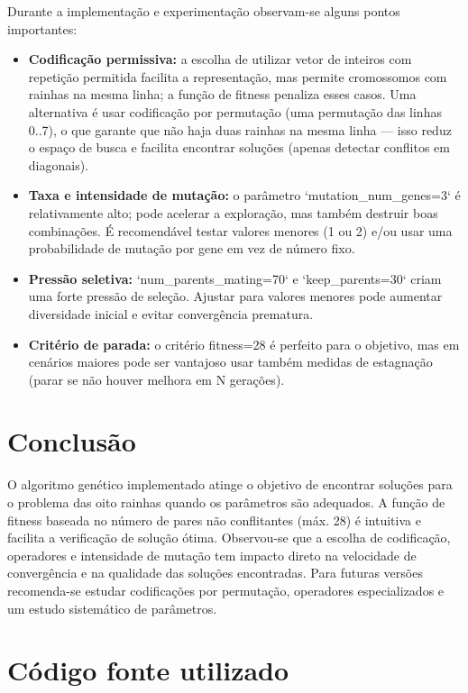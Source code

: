 \documentclass[a4paper,12pt]{article}
\begin{document}
Durante a implementação e experimentação observam-se alguns pontos importantes:

\begin{itemize}
  \item \textbf{Codificação permissiva:} a escolha de utilizar vetor de inteiros com repetição permitida facilita a representação, mas permite cromossomos com rainhas na mesma linha; a função de fitness penaliza esses casos. Uma alternativa é usar codificação por permutação (uma permutação das linhas 0..7), o que garante que não haja duas rainhas na mesma linha — isso reduz o espaço de busca e facilita encontrar soluções (apenas detectar conflitos em diagonais).
  \item \textbf{Taxa e intensidade de mutação:} o parâmetro `mutation\_num\_genes=3` é relativamente alto; pode acelerar a exploração, mas também destruir boas combinações. É recomendável testar valores menores (1 ou 2) e/ou usar uma probabilidade de mutação por gene em vez de número fixo.
  \item \textbf{Pressão seletiva:} `num\_parents\_mating=70` e `keep\_parents=30` criam uma forte pressão de seleção. Ajustar para valores menores pode aumentar diversidade inicial e evitar convergência prematura.
  \item \textbf{Critério de parada:} o critério fitness=28 é perfeito para o objetivo, mas em cenários maiores pode ser vantajoso usar também medidas de estagnação (parar se não houver melhora em N gerações).
\end{itemize}

\section{Conclusão}
\label{ch:conclusao}

O algoritmo genético implementado atinge o objetivo de encontrar soluções para o problema das oito rainhas quando os parâmetros são adequados. A função de fitness baseada no número de pares não conflitantes (máx. 28) é intuitiva e facilita a verificação de solução ótima. Observou-se que a escolha de codificação, operadores e intensidade de mutação tem impacto direto na velocidade de convergência e na qualidade das soluções encontradas. Para futuras versões recomenda-se estudar codificações por permutação, operadores especializados e um estudo sistemático de parâmetros.

\appendix
\section{Código fonte utilizado}
\label{app:codigo}





\end{document}
